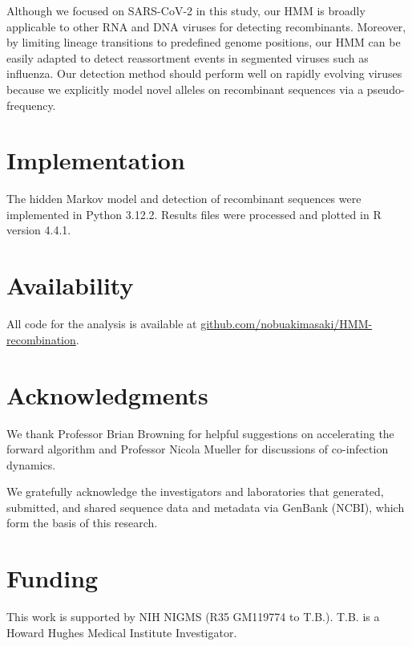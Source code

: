 \documentclass[11pt,oneside,letterpaper]{article}
\begin{document}
Although we focused on SARS-CoV-2 in this study, our HMM is broadly applicable to other RNA and DNA viruses for detecting recombinants. Moreover, by limiting lineage transitions to predefined genome positions, our HMM can be easily adapted to detect reassortment events in segmented viruses such as influenza. Our detection method should perform well on rapidly evolving viruses because we explicitly model novel alleles on recombinant sequences via a pseudo-frequency. 

\section{Implementation} 

The hidden Markov model and detection of recombinant sequences were implemented in Python 3.12.2. Results files were processed and plotted in R version 4.4.1.

\section{Availability}

All code for the analysis is available at \href{https://github.com/nobuakimasaki/HMM-recombination}{github.com/nobuakimasaki/HMM-recombination}.

\section{Acknowledgments}

We thank Professor Brian Browning for helpful suggestions on accelerating the forward algorithm and Professor Nicola Mueller for discussions of co-infection dynamics.

We gratefully acknowledge the investigators and laboratories that generated, submitted, and shared sequence data and metadata via GenBank (NCBI), which form the basis of this research.





\section{Funding} 

This work is supported by NIH NIGMS (R35 GM119774 to T.B.). T.B. is a Howard Hughes Medical Institute Investigator.



\end{document}
